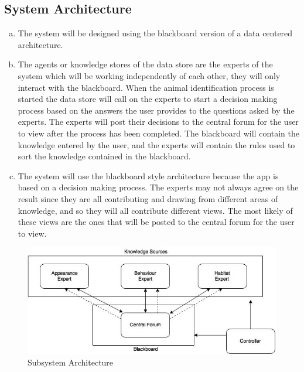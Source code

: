 \documentclass[]{article}
\begin{document}
\subsection{System Architecture}
\label{sub:system_architecture}
\begin{enumerate}[a)]
	\item The system will be designed using the blackboard version of a data centered architecture.
	\item The agents or knowledge stores of the data store are the experts of the system which will be working independently of each other, they will only interact with the blackboard. When the animal identification process is started the data store will call on the experts to start a decision making process based on the answers the user provides to the questions asked by the experts. The experts will post their decisions to the central forum for the user to view after the process has been completed. The blackboard will contain the knowledge entered by the user, and the experts will contain the rules used to sort the knowledge contained in the blackboard.
	\item The system will use the blackboard style architecture because the app is based on a decision making process. The experts may not always agree on the result since they are all contributing and drawing from different areas of knowledge, and so they will all contribute different views. The most likely of these views are the ones that will be posted to the central forum for the user to view.
\end{enumerate}
\begin{figure}[H]
	\centering
	\includegraphics[width = 14cm]{Subsystem_Architecture}
	\caption{Subsystem Architecture}
	\label{Subsystem Architecture}
\end{figure}
\end{document}
